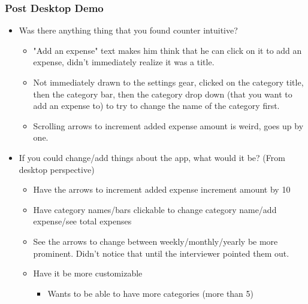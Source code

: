 \documentclass{chi2011}
\begin{document}
	\subsubsection{Post Desktop Demo}
	\begin{itemize}[noitemsep]
		\item Was there anything thing that you found counter intuitive?
		\begin{itemize}[noitemsep]
			\item "Add an expense" text makes him think that he can click on it to add an expense, didn't
					immediately realize it was a title. 
			\item Not immediately drawn to the settings gear, clicked on the category title, then the 
				  category bar, then the category drop down (that you want to add an expense to) to try to
				  change the name of the category first.
			\item Scrolling arrows to increment added expense amount is weird, goes up by one.
		\end{itemize}
		\item If you could change/add things about the app, what would it be? (From desktop perspective)
		\begin{itemize}[noitemsep]
			\item Have the arrows to increment added expense increment amount by 10
			\item Have category names/bars clickable to change category name/add expense/see total expenses
			\item See the arrows to change between weekly/monthly/yearly be more prominent. Didn't notice 
					that until the interviewer pointed them out. 
			\item Have it be more customizable
			\begin{itemize}[noitemsep]
				\item Wants to be able to have more categories (more than 5)
			\end{itemize}
		\end{itemize}
	\end{itemize}
	
\end{document}
